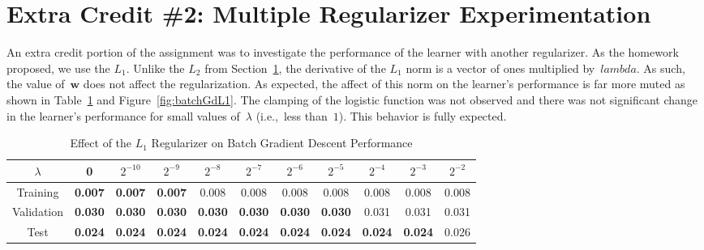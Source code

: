 \documentclass{report}
\newcommand{\w}{\mathbf{w}}
\begin{document}
  \section{Extra Credit \#2: Multiple Regularizer Experimentation}

  An extra credit portion of the assignment was to investigate the performance of the learner with another regularizer.  As the homework proposed, we use the $L_1$.  Unlike the $L_2$ from Section~\ref{}, the derivative of the $L_1$ norm is a vector of ones multiplied by~$lambda$.  As such, the value of~$\w$ does not affect the regularization.  As expected, the affect of this norm on the learner's performance is far more muted as shown in Table~\ref{tab:batchGradientDescentL1} and Figure~\ref{fig:batchGdL1}.  The clamping of the logistic function was not observed and there was not significant change in the learner's performance for small values of~$\lambda$ (i.e.,~less than~$1$).  This behavior is fully expected.

  \begin{table}[]
    \centering
    \caption{Effect of the $L_1$ Regularizer on Batch Gradient Descent Performance}
    \label{tab:batchGradientDescentL1}
    \begin{tabular}{c|c|c|c|c|c|c|c|c|c|c}
      \hline
      $\lambda$  & 0              & $2^{-10}$ & $2^{-9}$ & $2^{-8}$       & $2^{-7}$ & $2^{-6}$ & $2^{-5}$ & $2^{-4}$ & $2^{-3}$ & $2^{-2}$ \\ \hline
      Training   & \textbf{0.007} & \textbf{0.007}     & \textbf{0.007}    & 0.008 & 0.008    & 0.008    & 0.008    & 0.008    & 0.008    & 0.008    \\ \hline
      Validation & \textbf{0.030} & \textbf{0.030}    & \textbf{0.030}    & \textbf{0.030} & \textbf{0.030}    & \textbf{0.030}    & \textbf{0.030}    & 0.031    & 0.031    & 0.031    \\ \hline
      Test       & \textbf{0.024} & \textbf{0.024}     & \textbf{0.024}    & \textbf{0.024} & \textbf{0.024}    & \textbf{0.024}    & \textbf{0.024}    & \textbf{0.024}    & \textbf{0.024}    & 0.026    \\ \hline
    \end{tabular}
  \end{table}
\end{document}
